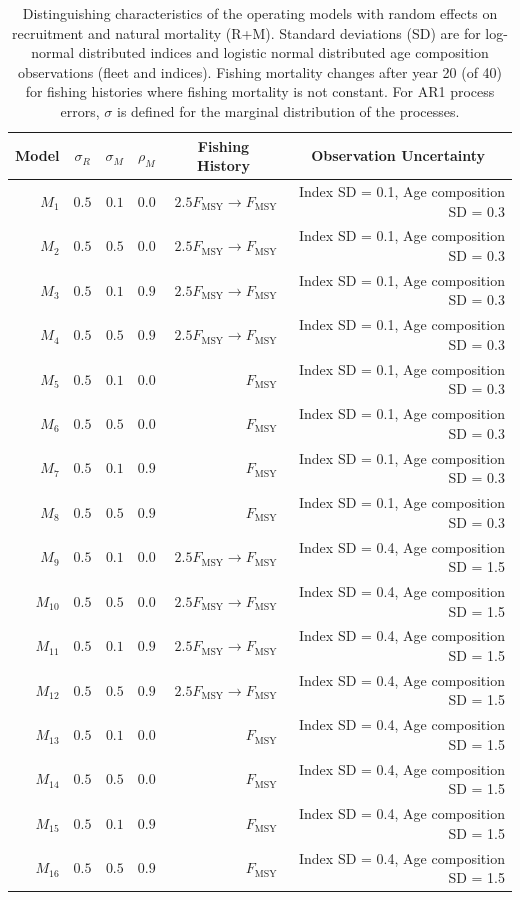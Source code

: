 \documentclass[
  12pt,
]{article}
\begin{document}
\begin{landscape}
\begin{table}
\caption{Distinguishing characteristics of the operating models with random effects on recruitment and natural mortality (R+M). Standard deviations (SD) are for log-normal distributed indices and logistic normal distributed age composition observations (fleet and indices). Fishing mortality changes after year 20 (of 40) for fishing histories where fishing mortality is not constant. For AR1 process errors, $\sigma$ is defined for the marginal distribution of the processes.}\label{M_om_table}
{\begin{center}
\begin{tabular}{rrrrrr}
\hline\hline
\multicolumn{1}{c}{Model}&\multicolumn{1}{c}{$\sigma_R$}&\multicolumn{1}{c}{$\sigma_{M}$}&\multicolumn{1}{c}{$\rho_{M}$}&\multicolumn{1}{c}{Fishing History}&\multicolumn{1}{c}{Observation Uncertainty}\tabularnewline
\hline
$M_{1}$&$0.5$&$0.1$&$0.0$&$2.5 F_{\text{MSY}} \rightarrow F_{\text{MSY}}$&Index SD = 0.1, Age composition SD = 0.3\tabularnewline
$M_{2}$&$0.5$&$0.5$&$0.0$&$2.5 F_{\text{MSY}} \rightarrow F_{\text{MSY}}$&Index SD = 0.1, Age composition SD = 0.3\tabularnewline
$M_{3}$&$0.5$&$0.1$&$0.9$&$2.5 F_{\text{MSY}} \rightarrow F_{\text{MSY}}$&Index SD = 0.1, Age composition SD = 0.3\tabularnewline
$M_{4}$&$0.5$&$0.5$&$0.9$&$2.5 F_{\text{MSY}} \rightarrow F_{\text{MSY}}$&Index SD = 0.1, Age composition SD = 0.3\tabularnewline
$M_{5}$&$0.5$&$0.1$&$0.0$&$F_{\text{MSY}}$&Index SD = 0.1, Age composition SD = 0.3\tabularnewline
$M_{6}$&$0.5$&$0.5$&$0.0$&$F_{\text{MSY}}$&Index SD = 0.1, Age composition SD = 0.3\tabularnewline
$M_{7}$&$0.5$&$0.1$&$0.9$&$F_{\text{MSY}}$&Index SD = 0.1, Age composition SD = 0.3\tabularnewline
$M_{8}$&$0.5$&$0.5$&$0.9$&$F_{\text{MSY}}$&Index SD = 0.1, Age composition SD = 0.3\tabularnewline
$M_{9}$&$0.5$&$0.1$&$0.0$&$2.5 F_{\text{MSY}} \rightarrow F_{\text{MSY}}$&Index SD = 0.4, Age composition SD = 1.5\tabularnewline
$M_{10}$&$0.5$&$0.5$&$0.0$&$2.5 F_{\text{MSY}} \rightarrow F_{\text{MSY}}$&Index SD = 0.4, Age composition SD = 1.5\tabularnewline
$M_{11}$&$0.5$&$0.1$&$0.9$&$2.5 F_{\text{MSY}} \rightarrow F_{\text{MSY}}$&Index SD = 0.4, Age composition SD = 1.5\tabularnewline
$M_{12}$&$0.5$&$0.5$&$0.9$&$2.5 F_{\text{MSY}} \rightarrow F_{\text{MSY}}$&Index SD = 0.4, Age composition SD = 1.5\tabularnewline
$M_{13}$&$0.5$&$0.1$&$0.0$&$F_{\text{MSY}}$&Index SD = 0.4, Age composition SD = 1.5\tabularnewline
$M_{14}$&$0.5$&$0.5$&$0.0$&$F_{\text{MSY}}$&Index SD = 0.4, Age composition SD = 1.5\tabularnewline
$M_{15}$&$0.5$&$0.1$&$0.9$&$F_{\text{MSY}}$&Index SD = 0.4, Age composition SD = 1.5\tabularnewline
$M_{16}$&$0.5$&$0.5$&$0.9$&$F_{\text{MSY}}$&Index SD = 0.4, Age composition SD = 1.5\tabularnewline
\hline
\end{tabular}\end{center}
}
\end{table}
\end{landscape}
\end{document}
